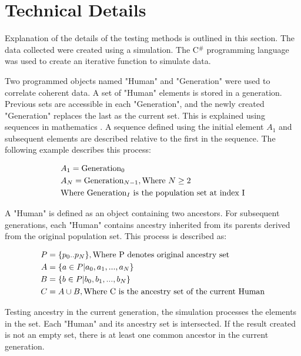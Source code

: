 \documentclass[12pt]{extarticle}
\begin{document}
\section{Technical Details}

Explanation of the details of the testing methods is outlined in this section. The data collected were created using a simulation. The C$^\#$ programming language was used to create an iterative function to simulate data.

Two programmed objects named "Human" and "Generation" were used to correlate coherent data. A set of "Human" elements is stored in a generation. Previous sets are accessible in each "Generation", and the newly created "Generation" replaces the last as the current set. This is explained using sequences in mathematics . A sequence defined using the initial element $A_1$ and subsequent elements are described relative to the first in the sequence. The following example describes this process:

\begin{align}
\notag
& A_1 = \text{Generation}_0 \\
\notag
& A_N =\text{Generation}_{N-1}, \text{Where } N \geq 2 \\
\notag
&\text{Where Generation}_I \text{ is the population set at index I} 
\end{align}

A "Human" is defined as an object containing two ancestors. For subsequent generations, each "Human" contains ancestry inherited from its parents derived from the original population set. This process is described as:

\begin{align}
\notag
P &= \{p_0..p_N\}, \text{Where P denotes original ancestry set} \\
\notag
A &= \{a\in P | a_0,a_1, ..., a_N\} \\
\notag
B &= \{b\in P| b_0,b_1, ..., b_N\} \\
\notag
C &= A \cup B, \text{Where C is the ancestry set of the current Human} \\
\end{align}

Testing ancestry in the current generation, the simulation processes the elements in the set. Each "Human" and its ancestry set is intersected. If the result created is not an empty set, there is at least one common ancestor in the current generation.
\end{document}
